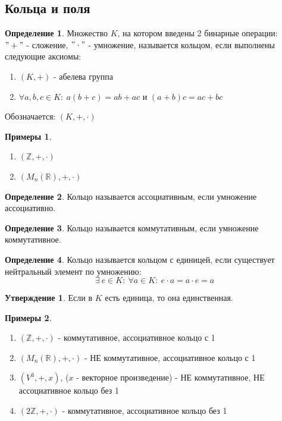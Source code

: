 \documentclass[a4paper, 12pt]{article}
\newcommand{\R}{\mathbb R}
\newcommand{\Z}{\mathbb Z}
\newcommand\tab[1][.5cm]{\hspace*{#1}}
\theoremstyle{definition}
\newtheorem*{definition}{Определение}
\newtheorem*{subtheorem}{Утверждение}
\newtheorem*{example}{Примеры}
\begin{document}
  \subsection{Кольца и поля}
  \begin{definition}
    Множество $K$, на котором введены 2 бинарные операции:\\ $"+"$ - сложение, $"\cdot"$ - умножение, называется кольцом, если выполнены следующие аксиомы:
    \begin{enumerate}
      \item $(K, +)$ - абелева группа
      \item $\forall a,b,c \in K: \ a(b+c) = ab+ac$ и $(a+b)c = ac+bc$
    \end{enumerate}
    Обозначается: $(K, +, \cdot)$
  \end{definition} 
  \begin{example}\tab
    \begin{enumerate}
      \item $(\Z, +, \cdot)$
      \item $(M_n(\R), +, \cdot)$
    \end{enumerate}
  \end{example}
  \begin{definition}
    Кольцо называется ассоциативным, если умножение ассоциативно.
  \end{definition}
  \begin{definition}
    Кольцо называется коммутативным, если умножение коммутативное.
  \end{definition}
  \begin{definition}
    Кольцо называется кольцом с единицей, если существует нейтральный элемент по умножению:
    $$\exists \ e \in K: \ \forall a\in K: \ e \cdot a = a \cdot e = a$$ 
  \end{definition}
  \begin{subtheorem}
    Если в $K$ есть единица, то она единственная. 
  \end{subtheorem} 
  \begin{example} \tab
    \begin{enumerate}
      \item $(\Z, +, \cdot)$ - коммутативное, ассоциативное кольцо с 1
      \item $(M_n(\R), +, \cdot)$ - НЕ коммутативное, ассоциативное кольцо с 1
      \item $(V^3,+, x)$, ($x$ - векторное произведение) - НЕ коммутативное, НЕ ассоциативное кольцо без 1
      \item $(2\Z, +, \cdot)$ -  коммутативное, ассоциативное кольцо без 1
    \end{enumerate}
  \end{example}
\end{document}
